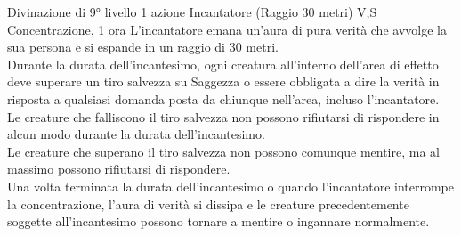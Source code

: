 {Divinazione di 9° livello}
{1 azione}
{Incantatore (Raggio 30 metri)}
{V,S}
{Concentrazione, 1 ora}
L'incantatore emana un'aura di pura verità che avvolge la sua persona e si espande in un raggio di 30 metri. \\ Durante la durata dell'incantesimo, ogni creatura all'interno dell'area di effetto deve superare un tiro salvezza su Saggezza o essere obbligata a dire la verità in risposta a qualsiasi domanda posta da chiunque nell'area, incluso l'incantatore. \\ Le creature che falliscono il tiro salvezza non possono rifiutarsi di rispondere in alcun modo durante la durata dell'incantesimo.\\ Le creature che superano il tiro salvezza non possono comunque mentire, ma al massimo possono rifiutarsi di rispondere. \\ Una volta terminata la durata dell'incantesimo o quando l'incantatore interrompe la concentrazione, l'aura di verità si dissipa e le creature precedentemente soggette all'incantesimo possono tornare a mentire o ingannare normalmente.
